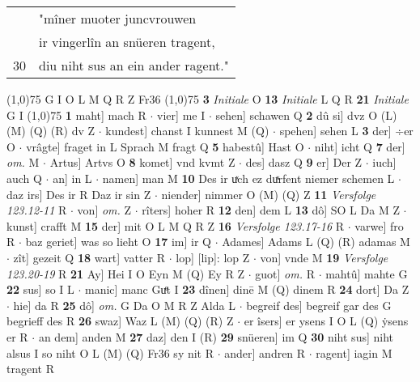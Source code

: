 \documentclass[8pt,a4paper,notitlepage]{article}
\begin{document}
\begin{table}[ht]
\begin{minipage}[t]{0.5\linewidth}
\begin{tabular}{rl}
 & "mîner muoter juncvrouwen\\ 
 & ir vingerlîn an snüeren tragent,\\ 
30 & diu niht sus an ein ander ragent."\\ 
\end{tabular}
\scriptsize
\line(1,0){75} \newline
G I O L M Q R Z Fr36 \newline
\line(1,0){75} \newline
\textbf{3} \textit{Initiale} O  \textbf{13} \textit{Initiale} L Q R  \textbf{21} \textit{Initiale} G I  \newline
\line(1,0){75} \newline
\textbf{1} maht] mach R  $\cdot$ vier] me I  $\cdot$ sehen] schawen Q \textbf{2} dû si] dvz O (L) (M) (Q) (R) dv Z  $\cdot$ kundest] chanst I kunnest M (Q)  $\cdot$ spehen] sehen L \textbf{3} der] ÷er O  $\cdot$ vrâgte] fraget in L Sprach M fragt Q \textbf{5} habestû] Hast O  $\cdot$ niht] icht Q \textbf{7} der] \textit{om.} M  $\cdot$ Artus] Artvs O \textbf{8} komet] vnd kvmt Z  $\cdot$ des] dasz Q \textbf{9} er] Der Z  $\cdot$ iuch] auch Q  $\cdot$ an] in L  $\cdot$ namen] man M \textbf{10} Des ir uͯch ez duͯrfent niemer schemen L  $\cdot$ daz irs] Des ir R Daz ir sin Z  $\cdot$ niender] nimmer O (M) (Q) Z \textbf{11} \textit{Versfolge 123.12-11} R   $\cdot$ von] \textit{om.} Z  $\cdot$ rîters] hoher R \textbf{12} den] dem L \textbf{13} dô] SO L Da M Z  $\cdot$ kunst] crafft M \textbf{15} der] mit O L M Q R Z \textbf{16} \textit{Versfolge 123.17-16} R   $\cdot$ varwe] fro R  $\cdot$ baz geriet] was so lieht O \textbf{17} im] ir Q  $\cdot$ Adames] Adams L (Q) (R) adamas M  $\cdot$ zît] gezeit Q \textbf{18} wart] vatter R  $\cdot$ lop] [lip]: lop Z  $\cdot$ von] vnde M \textbf{19} \textit{Versfolge 123.20-19} R  \textbf{21} Ay] Hei I O Eyn M (Q) Ey R Z  $\cdot$ guot] \textit{om.} R  $\cdot$ mahtû] mahte G \textbf{22} sus] so I L  $\cdot$ manic] manc Guͤt I \textbf{23} dînen] dinē M (Q) dinem R \textbf{24} dort] Da Z  $\cdot$ hie] da R \textbf{25} dô] \textit{om.} G Da O M R Z Alda L  $\cdot$ begreif des] begreif gar des G begrieff des R \textbf{26} swaz] Waz L (M) (Q) (R) Z  $\cdot$ er îsers] er ysens I O L (Q) ẏsens er R  $\cdot$ an dem] anden M \textbf{27} daz] den I (R) \textbf{29} snüeren] im Q \textbf{30} niht sus] niht alsus I so niht O L (M) (Q) Fr36 sy nit R  $\cdot$ ander] andren R  $\cdot$ ragent] iagin M tragent R \newline
\end{minipage}
\hspace{0.5cm}

\end{table}
\end{document}
